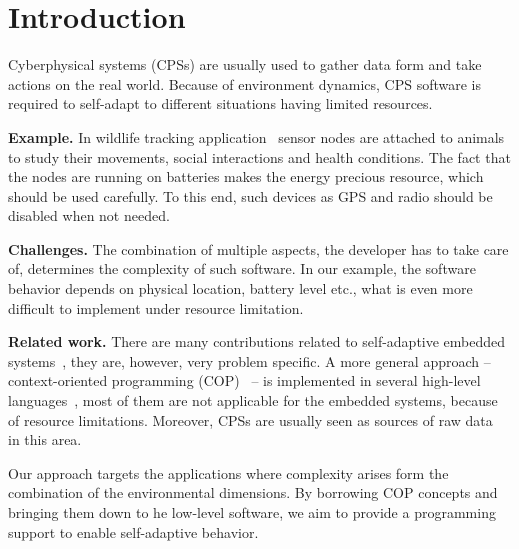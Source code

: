 \section{Introduction}
Cyberphysical systems (CPSs) are usually used to gather data form and take
actions on the real world. Because of environment dynamics, CPS software is
required to self-adapt to different situations having limited resources.

{\bfseries Example.} In wildlife tracking application~\cite{Pasztor10} sensor
nodes are attached to animals to study their movements, social interactions and
health conditions. The fact that the nodes are running on batteries makes the
energy precious resource, which should be used carefully. To this end, such
devices as GPS and radio should be disabled when not needed.

{\bfseries Challenges.} The combination of multiple aspects, the developer has
to take care of, determines the complexity of such software. In our example, the
software behavior depends on physical location, battery level etc., what is even
more difficult to implement under resource limitation.

{\bfseries Related work.} There are many contributions related to self-adaptive
embedded systems~\cite{Zimmerling12,Bourdenas11}, they are, however, very
problem specific. A more general approach -- context-oriented programming (COP)~\cite{Hirschfeld08} -- is implemented in several high-level
languages~\cite{Bardram05,Ghezzi10,Kamina11,Salvaneschi12,Sehic11}, most of them
are not applicable for the embedded systems, because of resource limitations. Moreover, CPSs are usually seen as sources of raw data~\cite{Sehic11} in
this area.

Our approach targets the applications where complexity arises form the
combination of the environmental dimensions. By borrowing COP concepts and
bringing them down to he low-level software, we aim to provide a programming
support to enable self-adaptive behavior.
